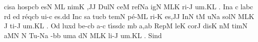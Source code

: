 \sgn cis\punctum a\egn
\spatium
\sgn h{o}{sp}\clivis cb\egn
\sgn {}es\punctum N\egn
\spatium
{}\clivis ML\egn
\sgn nim\punctum K\egn
\sgn {}{\ae},\punctum J\augmentum J\egn
\spatium
\divisiominor
\spatium
\sgn D{u}l\punctum N\egn
\sgn ce{}\punctum M\egn
\spatium
\sgn ref\pes Na\egn
{}ig\punctum N\egn
{}\climacus MLK\egn
\sgn ri{-}\punctum J\egn
\sgn {}u{m.}\punctum K\augmentum L\egn
\spatium
\divisiofinalis
{}.{}\egn
\spatium
\sgn {}In\punctum a\egn
\spatium
\custos c
\lineaproxima
\sgn lab\punctum c\egn
{}r\punctum d\egn
\sgn {}e{}\punctum d\egn
\spatium
\sgn r{\'e}q\clivis cb\egn
\sgn ui{-}\punctum c\egn
\sgn es.\punctum d\augmentum d\egn
\spatium
\divisiominor
\spatium
\sgn {}In\punctum c\egn
\spatium
\sgn {}{\ae}s\punctum a\egn
\sgn tu{}\clivis cb\egn
\spatium
\sgn tem\punctum N\egn
\sgn p{\'e}{-}\clivis ML\egn
\sgn ri{-}\punctum K\egn
\sgn {}e{s,}\punctum J\augmentum J\egn
\spatium
\divisiominor
\spatium
\sgn {}In\punctum N\egn
\spatium
{}t\punctum M\egn
\sgn {}u{}\pes Na\egn
\spatium
\sgn sol\punctum N\egn
{}\climacus MLK\egn
\custos J
\lineaproxima
\sgn ti{-}\punctum J\egn
\sgn {}u{m.}\punctum K\augmentum L\egn
\spatium
\divisiofinalis
{}.{}\egn
\spatium
\sgn {}O{}\punctum d\egn
\spatium
\sgn lux\punctum d\egn
\spatium
\sgn be{-}\clivis cb\egn
\sgn {}a-\punctum c\egn
\sgn t{\'\i}{ss}\clivis dc\egn
{}m\punctum b\egn
\sgn {}a,\punctum a\augmentum b\egn
\spatium
\divisiominor
\spatium
\sgn R{e}p\punctum M\egn
\sgn le{}\punctum K\egn
\spatium
\sgn c{o}r\punctum J\egn
\sgn dis\punctum K\egn
\spatium
\sgn {}{\'\i}n\punctum M\egn
\sgn tim\punctum N\egn
\sgn {}a{}\punctum M\augmentum N\egn
\spatium
\divisiominor
\spatium
\custos N\lineaproxima
\sgn Tu{-}\pes Na\egn
{}-\engl{}\bmolle b\punctum b\egn
{}um\punctum a\egn
\spatium
d\punctum N\egn
{}\climacus MLK\egn
\sgn li{-}\punctum J\egn
\sgn {}u{m.}\punctum K\augmentum L\egn
\spatium
\divisiofinalis
{}.{}\egn
\spatium
\sgn Sin\punctum d\egn
